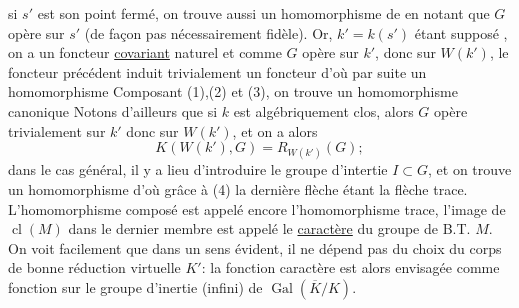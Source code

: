 si $s'$ est son point fermé, on trouve aussi un homomorphisme de 
en notant que $G$ opère sur $s'$ (de façon pas nécessairement fidèle). Or, $k'=k(s')$ étant supposé , on a un foncteur \uline{covariant} naturel
et comme $G$ opère sur $k'$, donc sur $W(k')$, le foncteur précédent induit trivialement un foncteur
d'où par suite un homomorphisme
Composant (1),(2) et (3), on trouve un homomorphisme canonique
Notons d'ailleurs que si $k$ est algébriquement clos, alors $G$ opère trivialement sur $k'$ donc sur $W(k')$, et on a alors
\[
K(W(k'),G)=R_{W(k')}(G);
\]
dans le cas général, il y a lieu d'introduire le groupe d'intertie $I\subset G$, et on trouve un homomorphisme
d'où grâce à (4)
la dernière flèche étant la flèche trace. L'homomorphisme composé est appelé encore l'homomorphisme trace, l'image de $\operatorname{cl}(M)$ dans le dernier membre est appelé le \uline{caractère} du groupe de B.T. $M$. On voit facilement que dans un sens évident, il ne dépend pas du choix du corps de bonne réduction virtuelle $K'$: la fonction caractère est alors envisagée comme fonction sur le groupe d'inertie (infini) de $\operatorname{Gal}(\overline K/K)$.

